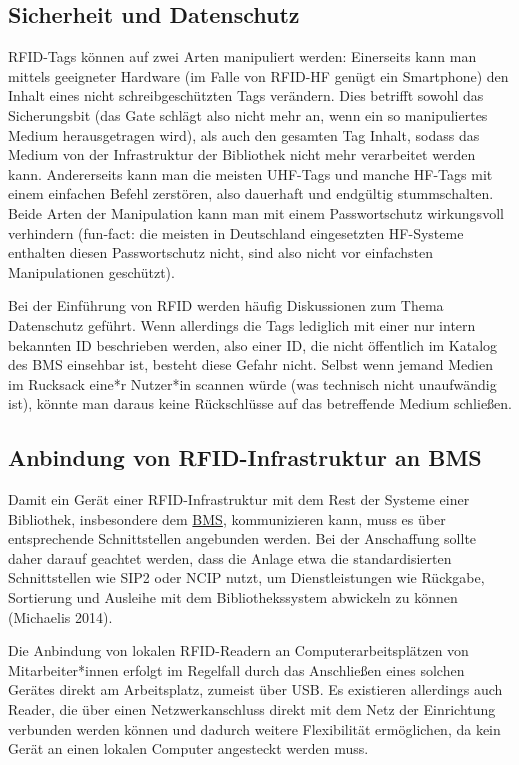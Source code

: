 \documentclass[
  11pt,
  letterpaper,
  DIV=11,
  twoside]{scrreprt}
\begin{document}
\subsection{Sicherheit und
Datenschutz}\label{sicherheit-und-datenschutz}

RFID-Tags können auf zwei Arten manipuliert werden: Einerseits kann man
mittels geeigneter Hardware (im Falle von RFID-HF genügt ein Smartphone)
den Inhalt eines nicht schreibgeschützten Tags verändern. Dies betrifft
sowohl das Sicherungsbit (das Gate schlägt also nicht mehr an, wenn ein
so manipuliertes Medium herausgetragen wird), als auch den gesamten Tag
Inhalt, sodass das Medium von der Infrastruktur der Bibliothek nicht
mehr verarbeitet werden kann. Andererseits kann man die meisten UHF-Tags
und manche HF-Tags mit einem einfachen Befehl zerstören, also dauerhaft
und endgültig stummschalten. Beide Arten der Manipulation kann man mit
einem Passwortschutz wirkungsvoll verhindern (fun-fact: die meisten in
Deutschland eingesetzten HF-Systeme enthalten diesen Passwortschutz
nicht, sind also nicht vor einfachsten Manipulationen geschützt).

Bei der Einführung von RFID werden häufig Diskussionen zum Thema
Datenschutz geführt. Wenn allerdings die Tags lediglich mit einer nur
intern bekannten ID beschrieben werden, also einer ID, die nicht
öffentlich im Katalog des BMS einsehbar ist, besteht diese Gefahr nicht.
Selbst wenn jemand Medien im Rucksack eine*r Nutzer*in scannen würde
(was technisch nicht unaufwändig ist), könnte man daraus keine
Rückschlüsse auf das betreffende Medium schließen.

\subsection{Anbindung von RFID-Infrastruktur an
BMS}\label{anbindung-von-rfid-infrastruktur-an-bms}

Damit ein Gerät einer RFID-Infrastruktur mit dem Rest der Systeme einer
Bibliothek, insbesondere dem
\hyperref[bibliotheksmanagementsysteme]{BMS}, kommunizieren kann, muss
es über entsprechende Schnittstellen angebunden werden. Bei der
Anschaffung sollte daher darauf geachtet werden, dass die Anlage etwa
die standardisierten Schnittstellen wie SIP2 oder NCIP nutzt, um
Dienstleistungen wie Rückgabe, Sortierung und Ausleihe mit dem
Bibliothekssystem abwickeln zu können (Michaelis 2014).

Die Anbindung von lokalen RFID-Readern an Computerarbeitsplätzen von
Mitarbeiter*innen erfolgt im Regelfall durch das Anschließen eines
solchen Gerätes direkt am Arbeitsplatz, zumeist über USB. Es existieren
allerdings auch Reader, die über einen Netzwerkanschluss direkt mit dem
Netz der Einrichtung verbunden werden können und dadurch weitere
Flexibilität ermöglichen, da kein Gerät an einen lokalen Computer
angesteckt werden muss.
\end{document}
